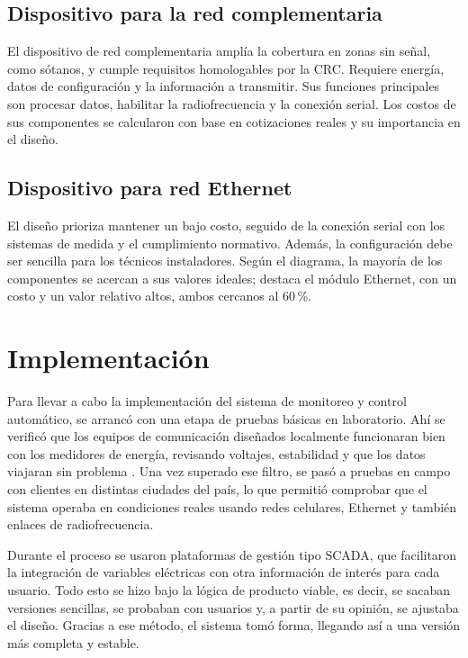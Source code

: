 \subsection{Dispositivo para la red complementaria}
El dispositivo de red complementaria amplía la cobertura en zonas sin señal, como sótanos, y cumple requisitos homologables por la CRC. Requiere energía, datos de configuración y la información a transmitir. Sus funciones principales son procesar datos, habilitar la radiofrecuencia y la conexión serial. Los costos de sus componentes se calcularon con base en cotizaciones reales y su importancia en el diseño.

\subsection{Dispositivo para red Ethernet}
El diseño prioriza mantener un bajo costo, seguido de la conexión serial con los sistemas de medida y el cumplimiento normativo. Además, la configuración debe ser sencilla para los técnicos instaladores. Según el diagrama, la mayoría de los componentes se acercan a sus valores ideales; destaca el módulo Ethernet, con un costo y un valor relativo altos, ambos cercanos al 60\,\%.

\section{Implementación}
Para llevar a cabo la implementación del sistema de monitoreo y control automático, se arrancó con una etapa de pruebas básicas en laboratorio. Ahí se verificó que los equipos de comunicación diseñados localmente funcionaran bien con los medidores de energía, revisando voltajes, estabilidad y que los datos viajaran sin problema \cite{Jaramillo2022}. Una vez superado ese filtro, se pasó a pruebas en campo con clientes en distintas ciudades del país, lo que permitió comprobar que el sistema operaba en condiciones reales usando redes celulares, Ethernet y también enlaces de radiofrecuencia.

Durante el proceso se usaron plataformas de gestión tipo SCADA, que facilitaron la integración de variables eléctricas con otra información de interés para cada usuario. Todo esto se hizo bajo la lógica de producto viable, es decir, se sacaban versiones sencillas, se probaban con usuarios y, a partir de su opinión, se ajustaba el diseño. Gracias a ese método, el sistema tomó forma, llegando así a una versión más completa y estable.

